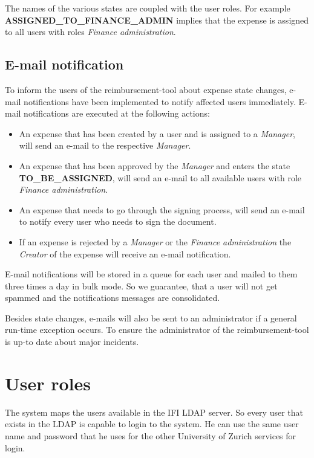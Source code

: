 The names of the various states are coupled with the user roles. For example \textbf{ASSIGNED\_TO\_FINANCE\_ADMIN} implies that the expense is assigned to all users with roles \textit{Finance administration}.

\subsection{E-mail notification}
To inform the users of the reimbursement-tool about expense state changes, e-mail notifications have been implemented to notify affected users immediately. E-mail notifications are executed at the following actions:
\begin{itemize}
    \item An expense that has been created by a user and is assigned to a \textit{Manager}, will send an e-mail to the respective \textit{Manager}.
    \item An expense that has been approved by the \textit{Manager} and enters the state \newline \textbf{TO\_BE\_ASSIGNED}, will send an e-mail to all available users with role \textit{Finance administration}.
    \item An expense that needs to go through the signing process, will send an e-mail to notify every user who needs to sign the document.
    \item If an expense is rejected by a \textit{Manager} or the \textit{Finance administration} the \textit{Creator} of the expense will receive an e-mail notification.
\end{itemize}

E-mail notifications will be stored in a queue for each user and mailed to them three times a day in bulk mode. So we guarantee, that a user will not get spammed and the notifications messages are consolidated.

Besides state changes, e-mails will also be sent to an administrator if a general run-time exception occurs. To ensure the administrator of the reimbursement-tool is up-to date about major incidents.


\section{User roles}
\label{user-roles}

The system maps the users available in the IFI LDAP server. So every user that exists in the LDAP is capable to login to the system. He can use the same user name and password that he uses for the other University of Zurich services for login. \par

